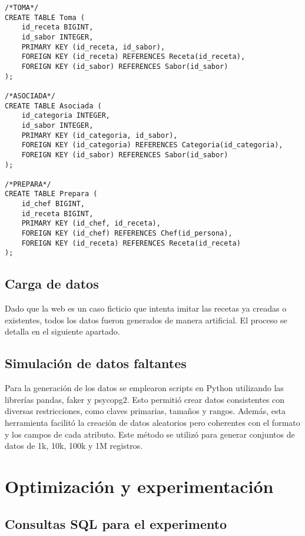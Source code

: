 \documentclass[12pt,a4paper]{article}
\begin{document}
\begin{lstlisting}
/*TOMA*/
CREATE TABLE Toma (
    id_receta BIGINT,
    id_sabor INTEGER,
    PRIMARY KEY (id_receta, id_sabor),
    FOREIGN KEY (id_receta) REFERENCES Receta(id_receta),
    FOREIGN KEY (id_sabor) REFERENCES Sabor(id_sabor)
);

/*ASOCIADA*/
CREATE TABLE Asociada (
    id_categoria INTEGER,
    id_sabor INTEGER,
    PRIMARY KEY (id_categoria, id_sabor),
    FOREIGN KEY (id_categoria) REFERENCES Categoria(id_categoria),
    FOREIGN KEY (id_sabor) REFERENCES Sabor(id_sabor)
);

/*PREPARA*/
CREATE TABLE Prepara (
    id_chef BIGINT,
    id_receta BIGINT,
    PRIMARY KEY (id_chef, id_receta),
    FOREIGN KEY (id_chef) REFERENCES Chef(id_persona),
    FOREIGN KEY (id_receta) REFERENCES Receta(id_receta)
);

\end{lstlisting}
\subsection{Carga de datos}
Dado que la web es un caso ficticio que intenta imitar las recetas ya creadas o existentes, todos los datos fueron generados de manera artificial. El proceso se detalla en el siguiente apartado.
\subsection{Simulación de datos faltantes}
Para la generación de los datos se emplearon scripts en Python utilizando las librerías pandas, faker y psycopg2. Esto permitió crear datos consistentes con diversas restricciones, como claves primarias, tamaños y rangos. Además, esta herramienta facilitó la creación de datos aleatorios pero coherentes con el formato y los campos de cada atributo. Este método se utilizó para generar conjuntos de datos de 1k, 10k, 100k y 1M registros.

\section{Optimización y experimentación}
\subsection{Consultas SQL para el experimento}
\end{document}
